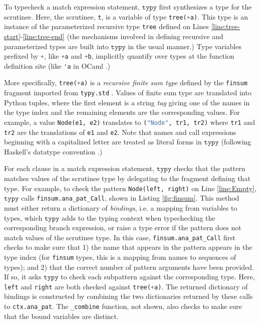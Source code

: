 \documentclass[preprint,10pt]{sigplanconf}
\newcommand{\typy}{\texttt{typy}}
\newcommand{\lip}[1]{\lstinline[language=Python,basicstyle=\ttfamily\footnotesize,deletendkeywords={tuple,buffer,map}]{#1}}
\newcommand{\li}[1]{\lip{#1}}
\begin{document}
To typecheck a match expression statement, $\typy$ first synthesizes a type for the scrutinee. Here, the scrutinee, \li{t}, is a variable of type \li{tree(+a)}. This type is an instance of the parameterized recursive type \li{tree} defined on Lines \ref{line:tree-start}-\ref{line:tree-end} (the mechanisms involved in defining recursive and parameterized types are built into $\typy$ in the usual manner.) Type variables prefixed by \li{+}, like \li{+a} and \li{+b}, implicitly quantify over types at the function definition site (like \lstinline[language=ML]{'a} in OCaml \cite{ocaml-manual}.) 

More specifically, \li{tree(+a)} is a \emph{recursive finite sum type} defined by the \li{finsum} fragment imported from \li{typy.std} \cite{pfpl}. Values of finite sum type are translated into Python tuples, where the first element is a string \emph{tag} giving one of the names in the type index and the remaining elements are the corresponding values. For example, a value \li{Node(e1, e2)} translates to \li{("Node", tr1, tr2)} where \li{tr1} and \li{tr2} are the translations of \li{e1} and \li{e2}. Note that names and call expressions beginning with a capitalized letter are treated as literal forms in $\typy$ (following Haskell's datatype convention \cite{jones2003haskell}.) 

For each clause in a match expression statement, $\typy$ checks that the pattern matches values of the scrutinee type by delegating to the fragment defining that type. For example, to check the pattern \li{Node(left, right)} on Line \ref{line:Empty}, $\typy$ calls \li{finsum.ana_pat_Call}, shown in Listing \ref{fig:finsum}. This method must either return a dictionary of \emph{bindings}, i.e. a mapping from variables to types, which $\typy$ adds to the typing context when typechecking the corresponding branch expression, or raise a type error if the pattern does not match values of the scrutinee type. In this case, \li{finsum.ana_pat_Call} first checks to make sure that 1) the name that appears in the pattern appears in the type index (for \li{finsum} types, this is a mapping from names to sequences of types); and 2) that the correct number of pattern arguments have been provided. If so, it asks $\typy$ to check each subpattern against the corresponding type. Here, \li{left} and \li{right} are both checked against \li{tree(+a)}. The returned dictionary of bindings is constructed by combining the two dictionaries returned by these calls to \li{ctx.ana_pat}. The \li{_combine} function, not shown, also checks to make sure that the bound variables are distinct.
\end{document}

